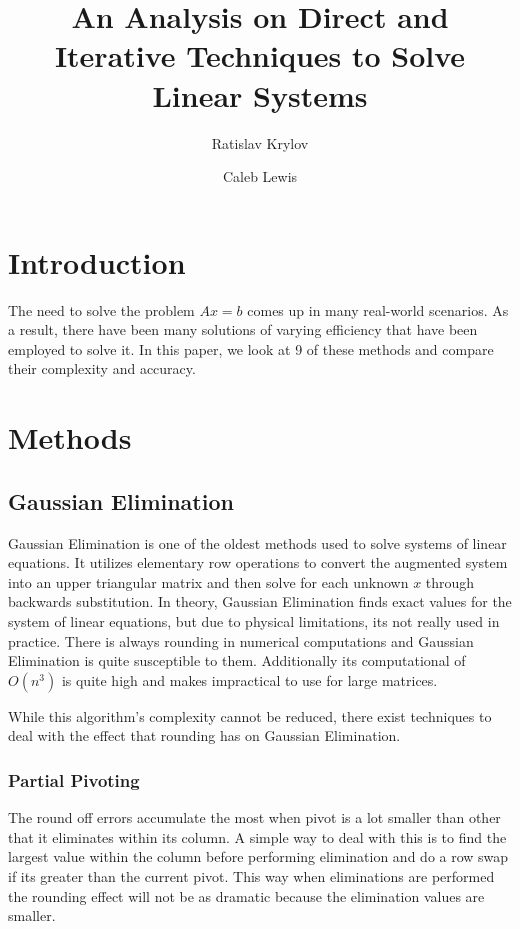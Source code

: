 \documentclass[11pt]{article}	%
\title{An Analysis on Direct and Iterative Techniques to Solve Linear Systems}
\author{Ratislav Krylov \and Caleb Lewis}
\begin{document}
\maketitle


\section{Introduction}
The need to solve the problem $Ax = b$ comes up in many real-world scenarios.
As a result, there have been many solutions of varying efficiency that
have been employed to solve it. In this paper, we look at 9 of these methods and
compare their complexity and accuracy.


\section{Methods}

\subsection{Gaussian Elimination}
Gaussian Elimination is one of the oldest methods used to solve systems of linear equations. It utilizes elementary row operations to convert the augmented system into an upper triangular matrix and then solve for each unknown $x$ through backwards substitution. In theory, Gaussian Elimination finds exact values for the system of linear equations, but due to physical limitations, its not really used in practice. There is always rounding in numerical computations and Gaussian Elimination is quite susceptible to them. Additionally its computational of $O(n^3)$ is quite high and makes impractical to use for large matrices. 

While this algorithm's complexity cannot be reduced, there exist techniques to deal with the effect that rounding has on Gaussian Elimination. 

    \subsubsection{Partial Pivoting}
    The round off errors accumulate the most when pivot is a lot smaller than other that it eliminates within its column. A simple way to deal with this is to find the largest value within the column before performing elimination and do a row swap if its greater than the current pivot. This way when eliminations are performed the rounding effect will not be as dramatic because the elimination values are smaller. 
\end{document}
